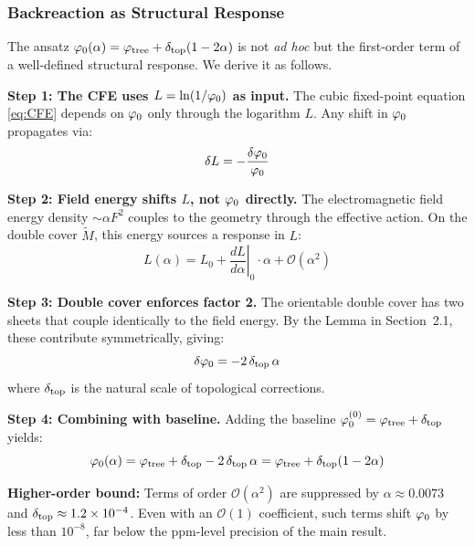\subsubsection{Backreaction as Structural Response}

The ansatz $\varphi_0(\alpha) = \varphi_{\mathrm{tree}} + \delta_{\mathrm{top}}(1-2\alpha)$ is not \emph{ad hoc} 
but the first-order term of a well-defined structural response. We derive it as follows.

\textbf{Step 1: The CFE uses $L = \ln(1/\varphi_0)$ as input.}
The cubic fixed-point equation \eqref{eq:CFE} depends on $\varphi_0$ only through 
the logarithm $L$. Any shift in $\varphi_0$ propagates via:
\begin{equation}
    \delta L = -\frac{\delta\varphi_0}{\varphi_0}
\end{equation}

\textbf{Step 2: Field energy shifts $L$, not $\varphi_0$ directly.}
The electromagnetic field energy density $\sim \alpha F^2$ couples to the 
geometry through the effective action. On the double cover $\widetilde{M}$, 
this energy sources a response in $L$:
\begin{equation}
    L(\alpha) = L_0 + \left.\frac{dL}{d\alpha}\right|_0 \cdot \alpha + \mathcal{O}(\alpha^2)
\end{equation}

\textbf{Step 3: Double cover enforces factor 2.}
The orientable double cover has two sheets that couple identically to the 
field energy. By the Lemma in Section~2.1, these contribute symmetrically, 
giving:
\begin{equation}
    \delta\varphi_0 = -2\,\delta_{\mathrm{top}}\,\alpha
\end{equation}
where $\delta_{\mathrm{top}}$ is the natural scale of topological corrections.

\textbf{Step 4: Combining with baseline.}
Adding the baseline $\varphi_0^{(0)} = \varphi_{\mathrm{tree}} + \delta_{\mathrm{top}}$ yields:
\begin{equation}
    \varphi_0(\alpha) = \varphi_{\mathrm{tree}} + \delta_{\mathrm{top}} - 2\,\delta_{\mathrm{top}}\,\alpha 
    = \varphi_{\mathrm{tree}} + \delta_{\mathrm{top}}(1 - 2\alpha)
\end{equation}

\begin{remark}
\textbf{Higher-order bound:} Terms of order $\mathcal{O}(\alpha^2)$ are 
suppressed by $\alpha \approx 0.0073$ and $\delta_{\mathrm{top}} \approx 1.2 \times 10^{-4}$. 
Even with an $\mathcal{O}(1)$ coefficient, such terms shift $\varphi_0$ by less 
than $10^{-8}$, far below the ppm-level precision of the main result.
\end{remark}

